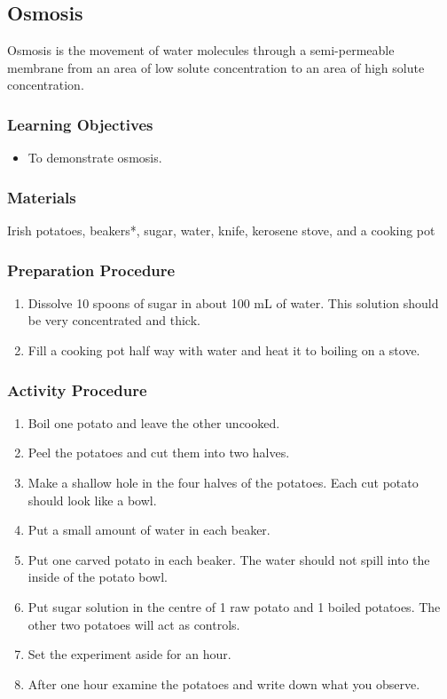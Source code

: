 \subsection{Osmosis}

Osmosis is the movement of water molecules through a semi-permeable membrane from an area of low solute concentration to an area of high solute concentration.

\subsubsection*{Learning Objectives}
\begin{itemize}
\item{To demonstrate osmosis.}
\end{itemize}

\subsubsection*{Materials}
Irish potatoes, beakers*, sugar, water, knife, kerosene stove, and a cooking pot

\subsubsection*{Preparation Procedure}
\begin{enumerate}
\item{Dissolve 10 spoons of sugar in about 100 mL of water. This solution should be very concentrated and thick.}
\item{Fill a cooking pot half way with water and heat it to boiling on a stove.}
\end{enumerate}

\subsubsection*{Activity Procedure}
\begin{enumerate}
\item{Boil one potato and leave the other uncooked.}
\item{Peel the potatoes and cut them into two halves.}
\item{Make a shallow hole in the four halves of the potatoes. Each cut potato should look like a bowl.}
\item{Put a small amount of water in each beaker.}
\item{Put one carved potato in each beaker. The water should not spill into the inside of the potato bowl.}
\item{Put sugar solution in the centre of 1 raw potato and 1 boiled potatoes. The other two potatoes will act as controls.}
\item{Set the experiment aside for an hour.}
\item{After one hour examine the potatoes and write down what you observe.}
\end{enumerate}

